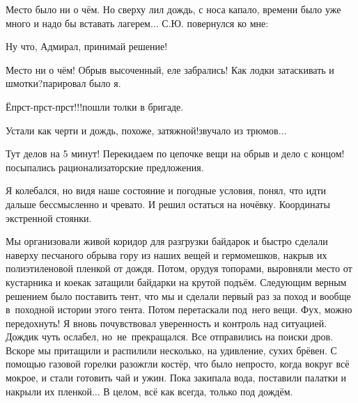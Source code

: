 
Место было ни о чём. Но сверху лил дождь, с носа капало, времени было уже много и надо бы вставать лагерем$\ldots$ С.Ю. повернулся ко мне: 

\diagdash Ну что, Адмирал, принимай решение! 

\diagdash Место ни о чём! Обрыв высоченный, еле забрались! Как лодки затаскивать и шмотки?\mdash парировал было я.

\diagdash Ёпрст-прст-прст!!!\mdash пошли толки в бригаде.

\diagdash Устали как черти и дождь, похоже, затяжной!\mdash звучало из трюмов$\ldots$

\diagdash Тут делов на 5 минут! Перекидаем по цепочке вещи на обрыв и дело с концом!\mdash посыпались рационализаторские предложения.

Я колебался, но видя наше состояние и погодные условия, понял, что идти дальше бессмысленно и чревато. И решил остаться на ночёвку. Координаты экстренной стоянки\mdash \CoordsChagodoschaSixteenEmergencyNignt.

Мы организовали живой коридор для разгрузки байдарок и быстро сделали наверху песчаного обрыва гору из наших вещей и гермомешков, накрыв их полиэтиленовой пленкой от дождя. Потом, орудуя топорами, выровняли место от кустарника и кое\sdash как затащили байдарки на крутой подъём. Следующим верным решением было поставить тент, что мы и сделали первый раз за поход и вообще в~походной истории этого тента. Потом перетаскали под~него вещи. Фух, можно передохнуть! Я вновь почувствовал уверенность и контроль над ситуацией. Дождик чуть ослабел, но~не~прекращался. Все отправились на поиски дров. Вскоре мы притащили и распилили несколько, на удивление, сухих брёвен. С помощью газовой горелки разожгли костёр, что было непросто, когда вокруг всё мокрое, и стали готовить чай и ужин. Пока закипала вода, поставили палатки и накрыли их пленкой$\ldots$ В целом, всё как всегда, только под дождём. 


